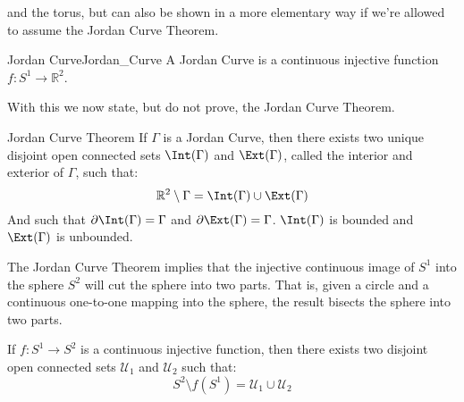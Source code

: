 \documentclass[crop=false,class=book,oneside]{standalone}                      %
\begin{document}
            and the torus, but can also be shown in a more elementary way if
            we're allowed to assume the Jordan Curve Theorem.
            \begin{ldefinition}{Jordan Curve}{Jordan_Curve}
                A Jordan Curve is a continuous injective function
                $f:S^{1}\rightarrow\mathbb{R}^{2}$.
            \end{ldefinition}
            With this we now state, but do not prove, the Jordan Curve Theorem.
            \begin{ftheorem}{Jordan Curve Theorem}{}
                If $\Gamma$ is a Jordan Curve, then there exists two unique
                disjoint open connected sets $\Int(\Gamma)$ and $\Ext(\Gamma)$,
                called the interior and exterior of $\Gamma$, such that:
                \begin{equation}
                    \mathbb{R}^{2}\setminus\Gamma=\Int(\Gamma)\cup\Ext(\Gamma)
                \end{equation}
                And such that $\partial\Int(\Gamma)=\Gamma$ and
                $\partial\Ext(\Gamma)=\Gamma$. $\Int(\Gamma)$ is
                bounded and $\Ext(\Gamma)$ is unbounded.
            \end{ftheorem}
            The Jordan Curve Theorem implies that the injective continuous
            image of $S^{1}$ into the sphere $S^{2}$ will cut the
            sphere into two parts. That is, given a circle and
            a continuous one-to-one mapping into the sphere, the
            result bisects the sphere into two parts.
            \begin{theorem}
                \label{thm:Sphere_Without_Circle_Is_Disconnected}
                If $f:S^{1}\rightarrow{S}^{2}$ is a continuous injective
                function, then there exists two disjoint open connected
                sets $\mathcal{U}_{1}$ and $\mathcal{U}_{2}$ such that:
                \begin{equation}
                    S^{2}\setminus{f}(S^{1})
                    =\mathcal{U}_{1}\cup\mathcal{U}_{2}
                \end{equation}
            \end{theorem}
\end{document}

